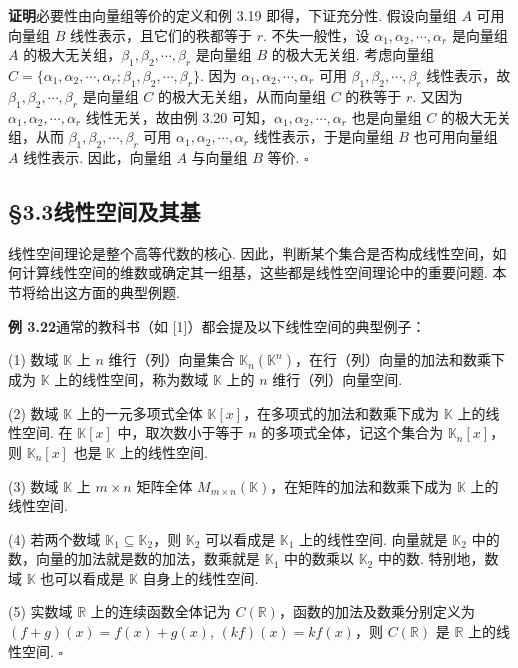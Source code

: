 \documentclass[UTF8,12pt,a4paper,fontset=fandol]{ctexart}
\begin{document}
\noindent\textbf{证明}\quad 必要性由向量组等价的定义和例 3.19 即得，下证充分性. 假设向量组 $A$ 可用向量组 $B$ 线性表示，且它们的秩都等于 $r$. 不失一般性，设 $\alpha_1,\alpha_2,\cdots,\alpha_r$ 是向量组 $A$ 的极大无关组，$\beta_1,\beta_2,\cdots,\beta_r$ 是向量组 $B$ 的极大无关组. 考虑向量组 $C=\{\alpha_1,\alpha_2,\cdots,\alpha_r;\beta_1,\beta_2,\cdots,\beta_r\}$. 因为 $\alpha_1,\alpha_2,\cdots,\alpha_r$ 可用 $\beta_1,\beta_2,\cdots,\beta_r$ 线性表示，故 $\beta_1,\beta_2,\cdots,\beta_r$ 是向量组 $C$ 的极大无关组，从而向量组 $C$ 的秩等于 $r$. 又因为 $\alpha_1,\alpha_2,\cdots,\alpha_r$ 线性无关，故由例 3.20 可知，$\alpha_1,\alpha_2,\cdots,\alpha_r$ 也是向量组 $C$ 的极大无关组，从而 $\beta_1,\beta_2,\cdots,\beta_r$ 可用 $\alpha_1,\alpha_2,\cdots,\alpha_r$ 线性表示，于是向量组 $B$ 也可用向量组 $A$ 线性表示. 因此，向量组 $A$ 与向量组 $B$ 等价. $\square$

\subsection*{§3.3\quad 线性空间及其基}

线性空间理论是整个高等代数的核心. 因此，判断某个集合是否构成线性空间，如何计算线性空间的维数或确定其一组基，这些都是线性空间理论中的重要问题. 本节将给出这方面的典型例题.

\noindent\textbf{例 3.22}\quad 通常的教科书（如 [1]）都会提及以下线性空间的典型例子：

(1) 数域 $\mathbb{K}$ 上 $n$ 维行（列）向量集合 $\mathbb{K}_n(\mathbb{K}^n)$，在行（列）向量的加法和数乘下成为 $\mathbb{K}$ 上的线性空间，称为数域 $\mathbb{K}$ 上的 $n$ 维行（列）向量空间.

(2) 数域 $\mathbb{K}$ 上的一元多项式全体 $\mathbb{K}[x]$，在多项式的加法和数乘下成为 $\mathbb{K}$ 上的线性空间. 在 $\mathbb{K}[x]$ 中，取次数小于等于 $n$ 的多项式全体，记这个集合为 $\mathbb{K}_n[x]$，则 $\mathbb{K}_n[x]$ 也是 $\mathbb{K}$ 上的线性空间.

(3) 数域 $\mathbb{K}$ 上 $m\times n$ 矩阵全体 $M_{m\times n}(\mathbb{K})$，在矩阵的加法和数乘下成为 $\mathbb{K}$ 上的线性空间.

(4) 若两个数域 $\mathbb{K}_1\subseteq\mathbb{K}_2$，则 $\mathbb{K}_2$ 可以看成是 $\mathbb{K}_1$ 上的线性空间. 向量就是 $\mathbb{K}_2$ 中的数，向量的加法就是数的加法，数乘就是 $\mathbb{K}_1$ 中的数乘以 $\mathbb{K}_2$ 中的数. 特别地，数域 $\mathbb{K}$ 也可以看成是 $\mathbb{K}$ 自身上的线性空间.

(5) 实数域 $\mathbb{R}$ 上的连续函数全体记为 $C(\mathbb{R})$，函数的加法及数乘分别定义为 $(f+g)(x)=f(x)+g(x)$, $(kf)(x)=kf(x)$，则 $C(\mathbb{R})$ 是 $\mathbb{R}$ 上的线性空间. $\square$
\end{document}
